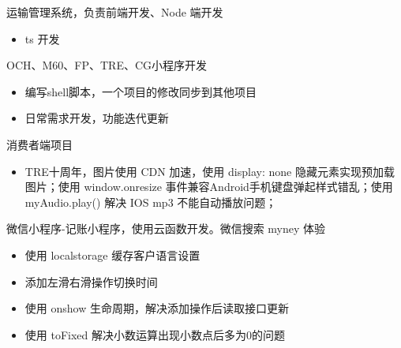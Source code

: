 \documentclass{resume}
\begin{document}
\begin{onehalfspacing}
运输管理系统，负责前端开发、Node 端开发
\begin{itemize}
  \item ts 开发
\end{itemize}
\end{onehalfspacing}

\begin{onehalfspacing}
OCH、M60、FP、TRE、CG小程序开发
\begin{itemize}
  \item 编写shell脚本，一个项目的修改同步到其他项目
  \item 日常需求开发，功能迭代更新
\end{itemize}
\end{onehalfspacing}

\begin{onehalfspacing}
消费者端项目
\begin{itemize}
  \item TRE十周年，图片使用 CDN 加速，使用 display: none 隐藏元素实现预加载图片；使用 window.onresize 事件兼容Android手机键盘弹起样式错乱；使用 myAudio.play() 解决 IOS mp3 不能自动播放问题；
\end{itemize}
\end{onehalfspacing}

\begin{onehalfspacing}
微信小程序-记账小程序，使用云函数开发。微信搜索 myney 体验
\begin{itemize}
  \item 使用 localstorage 缓存客户语言设置
  \item 添加左滑右滑操作切换时间
  \item 使用 onshow 生命周期，解决添加操作后读取接口更新
  \item 使用 toFixed 解决小数运算出现小数点后多为0的问题
\end{itemize}
\end{onehalfspacing}

\end{document}
